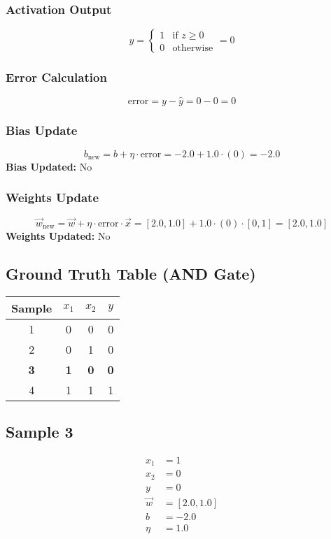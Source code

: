 \documentclass{article}
\begin{document}
\subsubsection*{Activation Output}
\[
\hat{y} =
\begin{cases}
1 & \text{if } z \geq 0 \\
0 & \text{otherwise}
\end{cases}
= 0
\]

\subsubsection*{Error Calculation}
\[
\text{error} = y - \hat{y} = 0 - 0 = 0
\]

\subsubsection*{Bias Update}
\[
b_{\text{new}} = b + \eta \cdot \text{error} = -2.0 + 1.0 \cdot (0) = -2.0
\]
\textbf{Bias Updated:} No

\subsubsection*{Weights Update}
\[
\vec{w}_{\text{new}} = \vec{w} + \eta \cdot \text{error} \cdot \vec{x} = 
[2.0, 1.0] + 1.0 \cdot (0) \cdot [0, 1] = 
[2.0, 1.0]
\]
\textbf{Weights Updated:} No

\subsection*{Ground Truth Table (AND Gate)}
\begin{center}
\begin{tabular}{|c|c|c|c|}
\hline
\textbf{Sample} & $x_1$ & $x_2$ & $y$ \\
\hline
1 & 0 & 0 & 0 \\
\hline
2 & 0 & 1 & 0 \\
\hline
\rowcolor{yellow} \textbf{3} & \textbf{1} & \textbf{0} & \textbf{0} \\
\hline
4 & 1 & 1 & 1 \\
\hline
\end{tabular}
\end{center}

\subsection*{Sample 3}
\begin{align*}
x_1 &= 1 \\
x_2 &= 0 \\
y &= 0 \\
\vec{w} &= [2.0, 1.0] \\
b &= -2.0 \\
\eta &= 1.0
\end{align*}
\end{document}
